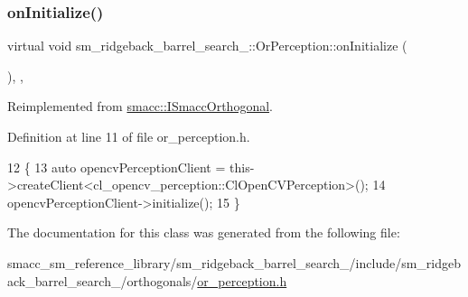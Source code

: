 \subsubsection{\texorpdfstring{on\+Initialize()}{onInitialize()}}
{\footnotesize\ttfamily virtual void sm\+\_\+ridgeback\+\_\+barrel\+\_\+search\+\_\+::\+Or\+Perception\+::on\+Initialize (\begin{DoxyParamCaption}{ }\end{DoxyParamCaption})\hspace{0.3cm}{\ttfamily [inline]}, {\ttfamily [override]}, {\ttfamily [virtual]}}



Reimplemented from \hyperlink{classsmacc_1_1ISmaccOrthogonal_a6bb31c620cb64dd7b8417f8705c79c7a}{smacc\+::\+I\+Smacc\+Orthogonal}.



Definition at line 11 of file or\+\_\+perception.\+h.


\begin{DoxyCode}
12   \{
13     \textcolor{keyword}{auto} opencvPerceptionClient = this->createClient<cl\_opencv\_perception::ClOpenCVPerception>();
14     opencvPerceptionClient->initialize();
15   \}
\end{DoxyCode}


The documentation for this class was generated from the following file\+:\begin{DoxyCompactItemize}
\item 
smacc\+\_\+sm\+\_\+reference\+\_\+library/sm\+\_\+ridgeback\+\_\+barrel\+\_\+search\+\_/include/sm\+\_\+ridgeback\+\_\+barrel\+\_\+search\+\_/orthogonals/\hyperlink{sm__ridgeback__barrel__search__2_2include_2sm__ridgeback__barrel__search__2_2orthogonals_2or__perception_8h}{or\+\_\+perception.\+h}\end{DoxyCompactItemize}
